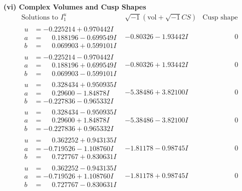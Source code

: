\documentclass[1p]{elsarticle_modified}
\theoremstyle{definition}
\newcommand{\I}{\sqrt{-1}}
\begin{document}
\newpage\flushleft \textbf{(vi) Complex Volumes and Cusp Shapes}
$$\begin{array}{c|c|c}  
\text{Solutions to }I^u_{1}& \I (\text{vol} + \sqrt{-1}CS) & \text{Cusp shape}\\
 \hline 
\begin{aligned}
u &= -0.225214 + 0.970442 I \\
a &= \phantom{-}0.188196 - 0.699549 I \\
b &= \phantom{-}0.069903 + 0.599101 I\end{aligned}
 & -0.80326 - 1.93442 I & \phantom{-0.000000 } 0 \\ \hline\begin{aligned}
u &= -0.225214 - 0.970442 I \\
a &= \phantom{-}0.188196 + 0.699549 I \\
b &= \phantom{-}0.069903 - 0.599101 I\end{aligned}
 & -0.80326 + 1.93442 I & \phantom{-0.000000 } 0 \\ \hline\begin{aligned}
u &= \phantom{-}0.328434 + 0.950935 I \\
a &= \phantom{-}0.29600 - 1.84878 I \\
b &= -0.227836 - 0.965332 I\end{aligned}
 & -5.38486 + 3.82100 I & \phantom{-0.000000 } 0 \\ \hline\begin{aligned}
u &= \phantom{-}0.328434 - 0.950935 I \\
a &= \phantom{-}0.29600 + 1.84878 I \\
b &= -0.227836 + 0.965332 I\end{aligned}
 & -5.38486 - 3.82100 I & \phantom{-0.000000 } 0 \\ \hline\begin{aligned}
u &= \phantom{-}0.362252 + 0.943135 I \\
a &= -0.719526 - 1.108760 I \\
b &= \phantom{-}0.727767 + 0.830631 I\end{aligned}
 & -1.81178 - 0.98745 I & \phantom{-0.000000 } 0 \\ \hline\begin{aligned}
u &= \phantom{-}0.362252 - 0.943135 I \\
a &= -0.719526 + 1.108760 I \\
b &= \phantom{-}0.727767 - 0.830631 I\end{aligned}
 & -1.81178 + 0.98745 I & \phantom{-0.000000 } 0 \\ \hline\begin{aligned}

\end{aligned}
\end{array}$$
\end{document}
